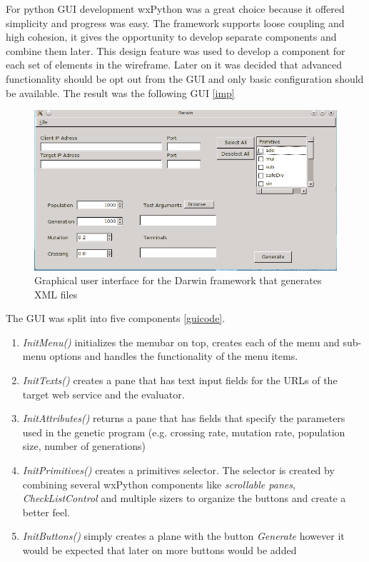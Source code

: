 For python GUI development wxPython was a great choice because it offered simplicity and progress was easy.
The framework supports loose coupling and high cohesion, it gives the opportunity to develop separate components
and combine them later. This design feature was used to develop a component for each set of elements in the
wireframe. Later on it was decided that advanced functionality should be opt out from the GUI and only
basic configuration should be available. The result was the following GUI \ref{imp}

\begin{figure}[htp]
\centering
\includegraphics[scale=0.7]{Figures/gui.png}
\caption{Graphical user interface for the Darwin framework that generates XML files}
\label{fig:guiimp}
\end{figure}

The GUI was split into five components \ref{guicode}.

\begin{enumerate}
	\item \textit{InitMenu()} initializes the menubar on top, creates each of the menu and sub-menu options and 
	handles the functionality of the menu items.
	\item \textit{InitTexts()} creates a pane that has text input fields for the URLs of the target web service and 
	the evaluator.
	\item \textit{InitAttributes()} returns a pane that has fields that specify the parameters used in the genetic program (e.g. crossing rate, mutation rate, population size, number of generations)
	\item \textit{InitPrimitives()} creates a primitives selector. The selector is created by combining several wxPython components like \textit{scrollable panes}, \textit{CheckListControl} and multiple
	sizers to organize the buttons and create a better feel.
	\item \textit{InitButtons()} simply creates a plane with the button \textit{Generate} however it would be expected that later on more buttons would be added
\end{enumerate} 

